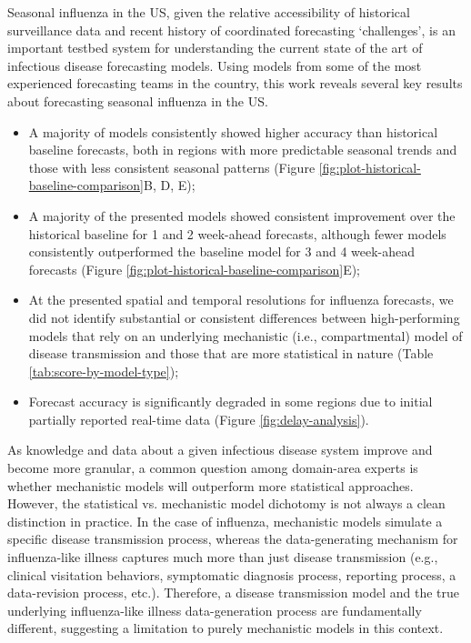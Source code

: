 \documentclass{article}\usepackage[]{graphicx}\usepackage[]{color}
\begin{document}
Seasonal influenza in the US, given the relative accessibility of historical surveillance data and recent history of coordinated forecasting `challenges', is an important testbed system for understanding the current state of the art of infectious disease forecasting models.
Using models from some of the most experienced forecasting teams in the country, this work reveals several key results about forecasting seasonal influenza in the US. 
\begin{itemize}
    \item A majority of models consistently showed higher accuracy than historical baseline forecasts, both in regions with more predictable seasonal trends and those with less consistent seasonal patterns (Figure \ref{fig:plot-historical-baseline-comparison}B, D, E);
    \item A majority of the presented models showed consistent improvement over the historical baseline for 1 and 2 week-ahead forecasts, although fewer models consistently outperformed the baseline model for 3 and 4 week-ahead forecasts (Figure \ref{fig:plot-historical-baseline-comparison}E);
    \item At the presented spatial and temporal resolutions for influenza forecasts, we did not identify substantial or consistent differences between high-performing models that rely on an underlying mechanistic (i.e., compartmental) model of disease transmission and those that are more statistical in nature (Table \ref{tab:score-by-model-type});
    \item Forecast accuracy is significantly degraded in some regions due to initial partially reported real-time data (Figure \ref{fig:delay-analysis}).
\end{itemize}

As knowledge and data about a given infectious disease system improve and become more granular, a common question among domain-area experts is whether mechanistic models will outperform more statistical approaches.
However, the statistical vs. mechanistic model dichotomy is not always a clean distinction in practice.
In the case of influenza, mechanistic models simulate a specific disease transmission process, whereas the data-generating mechanism for influenza-like illness captures much more than just disease transmission (e.g., clinical visitation behaviors, symptomatic diagnosis process, reporting process, a data-revision process, etc.). 
Therefore, a disease transmission model and the true underlying influenza-like illness data-generation process are fundamentally different, suggesting a limitation to purely mechanistic models in this context.
\end{document}
